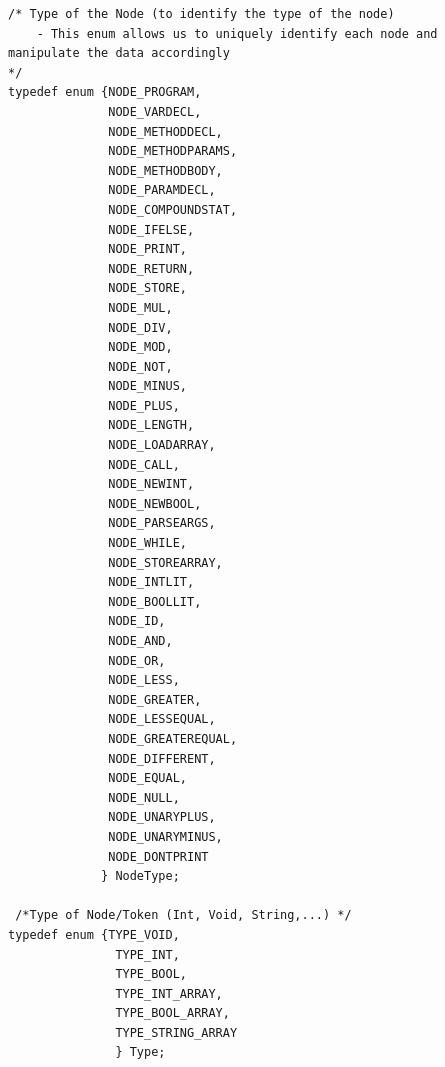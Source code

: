 \documentclass[12pt]{article}
\begin{document}
\begin{lstlisting}
/* Type of the Node (to identify the type of the node) 
	- This enum allows us to uniquely identify each node and manipulate the data accordingly
*/
typedef enum {NODE_PROGRAM,
              NODE_VARDECL,
              NODE_METHODDECL,
              NODE_METHODPARAMS,
              NODE_METHODBODY,
              NODE_PARAMDECL,
              NODE_COMPOUNDSTAT,
              NODE_IFELSE,
              NODE_PRINT,
              NODE_RETURN,
              NODE_STORE,
              NODE_MUL,
              NODE_DIV,
              NODE_MOD,
              NODE_NOT,
              NODE_MINUS,
              NODE_PLUS,
              NODE_LENGTH,
              NODE_LOADARRAY,
              NODE_CALL,
              NODE_NEWINT,
              NODE_NEWBOOL,
              NODE_PARSEARGS,
              NODE_WHILE,
              NODE_STOREARRAY,
              NODE_INTLIT,
              NODE_BOOLLIT,
              NODE_ID,
              NODE_AND,
              NODE_OR,
              NODE_LESS,
              NODE_GREATER,
              NODE_LESSEQUAL,
              NODE_GREATEREQUAL,
              NODE_DIFFERENT,
              NODE_EQUAL,
              NODE_NULL,
              NODE_UNARYPLUS,
              NODE_UNARYMINUS,
              NODE_DONTPRINT
             } NodeType;
  
 /*Type of Node/Token (Int, Void, String,...) */            
typedef enum {TYPE_VOID, 
		       TYPE_INT,
		       TYPE_BOOL, 
		       TYPE_INT_ARRAY, 
		       TYPE_BOOL_ARRAY, 
		       TYPE_STRING_ARRAY
		       } Type;
\end{lstlisting}

 
\end{document}
